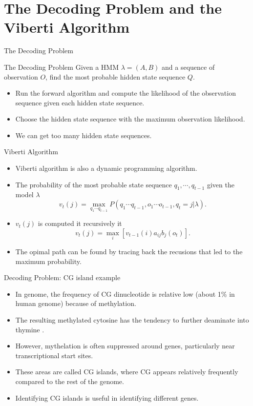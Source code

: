 \documentclass{beamer}
\begin{document}
\section{The Decoding Problem and the Viberti Algorithm}
\begin{frame}{The Decoding Problem }
	\begin{block}{The Decoding Problem}
		Given a HMM $\lambda = (A,B)$ and a sequence of observation $O$, find the most probable hidden state sequence $Q$.
	\end{block}
	\begin{itemize}
		\item Run the forward algorithm and compute the likelihood of the observation sequence given each hidden state sequence.
		\item Choose the hidden state sequence with the maximum observation likelihood.
		\item We can get too many hidden state sequences.
	\end{itemize}
\end{frame}

\begin{frame}{Viberti Algorithm}
	\begin{itemize}
		\item Viberti algorithm is also a dynamic programming algorithm.
		\item The probability of the most probable state sequence $q_1, \cdots, q_{t-1}$ given the model $\lambda$
		\begin{equation}
			v_t(j) = \max_{q_1\cdots q_{t-1}} P(q_1\cdots q_{t-1}, o_1\cdots o_{t-1}, q_t = j \vert \lambda).
		\end{equation}
		\item $v_t(j)$ is computed it recursively it 
		\begin{equation}
			v_t(j) = \max_i[v_{t-1}(i) a_{ij} b_j(o_t)].
		\end{equation}
		\item The opimal path can be found by tracing back the recusions that led to the maximum probability.
	\end{itemize}
\end{frame}


\begin{frame}{Decoding Problem: CG island example}
	\begin{itemize}
		\item In genome, the frequency of CG dinucleotide is relative low (about 1\% in human genome) because of methylation. 
		\item The resulting methylated cytosine has the tendency to further deaminate into thymine \cite{compeau2018bioinformatics}.
		\item However, mythelation is often suppressed around genes, particularly near transcriptional start sites.
		\item These areas are called CG islands, where CG appears relatively frequently compared to the rest of the genome.
		\item Identifying CG islands is useful in identifying different genes.
	\end{itemize}
\end{frame}
\end{document}
